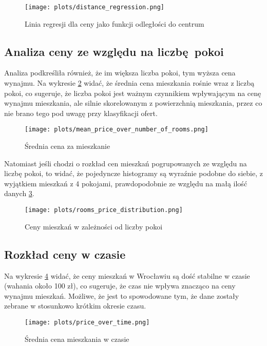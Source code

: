 \documentclass[12pt]{article}
\begin{document}
\begin{figure}[h]
  \centering
  \texttt{[image: plots/distance\_regression.png]}
  \caption{Linia regresji dla ceny jako funkcji odległości do centrum}
  \label{fig:distance_regression}
\end{figure}



\subsection{Analiza ceny ze względu na liczbę pokoi}
Analiza podkreśliła również, że im większa liczba pokoi, tym wyższa cena wynajmu. Na wykresie \ref{fig:mean_price_over_number_of_rooms} widać, że średnia cena mieszkania rośnie wraz z liczbą pokoi, co sugeruje, że liczba pokoi jest ważnym czynnikiem wpływającym na cenę wynajmu mieszkania, ale silnie skorelowanym z powierzchnią mieszkania, przez co nie brano tego pod uwagę przy klasyfikacji ofert.

\begin{figure}[h]
  \centering
  \texttt{[image: plots/mean\_price\_over\_number\_of\_rooms.png]}
  \caption{Średnia cena za mieszkanie}
  \label{fig:mean_price_over_number_of_rooms}
\end{figure}

Natomiast jeśli chodzi o rozkład cen mieszkań pogrupowanych ze względu na liczbę pokoi, to widać, że pojedyncze histogramy są wyraźnie podobne do siebie, z wyjątkiem mieszkań z 4 pokojami, prawdopodobnie ze względu na małą ilość danych \ref{fig:rooms_price_distribution}.

\begin{figure}[h!]
  \centering
  \texttt{[image: plots/rooms\_price\_distribution.png]}
  \caption{Ceny mieszkań w zależności od liczby pokoi}
  \label{fig:rooms_price_distribution}
\end{figure}

\pagebreak

\subsection{Rozkład ceny w czasie}
Na wykresie \ref{fig:price_over_time} widać, że ceny mieszkań w Wrocławiu są dość stabilne w czasie (wahania około 100 zł), co sugeruje, że czas nie wpływa znacząco na ceny wynajmu mieszkań. Możliwe, że jest to spowodowane tym, że dane zostały zebrane w stosunkowo krótkim okresie czasu.

\begin{figure}[h!]
  \centering
  \texttt{[image: plots/price\_over\_time.png]}
  \caption{Średnia cena mieszkania w czasie}
  \label{fig:price_over_time}
\end{figure}
\end{document}
